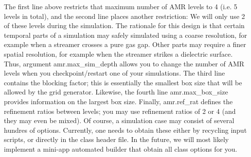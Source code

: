 The first line above restricts that maximum number of A\+MR levels to 4 (i.\+e. 5 levels in total), and the second line places another restriction\+: We will only use 2 of these levels during the simulation. The rationale for this design is that certain temporal parts of a simulation may safely simulated using a coarse resolution, for example when a streamer crosses a pure gas gap. Other parts may require a finer spatial resolution, for example when the streamer strikes a dielectric surface. Thus, argument amr.\+max\+\_\+sim\+\_\+depth allows you to change the number of A\+MR levels when you checkpoint/restart one of your simulations. The third line contains the blocking factor; this is essentially the smallest box size that will be allowed by the grid generator. Likewise, the fourth line amr.\+max\+\_\+box\+\_\+size provides information on the largest box size. Finally, amr.\+ref\+\_\+rat defines the refinement ratios between levels; you may use refinement ratios of 2 or 4 (and they may even be mixed). Of course, a simulation case may consist of several hundres of options. Currently, one needs to obtain these either by recycling input scripts, or directly in the class header file. In the future, we will most likely implement a mini-\/app automated builder that obtain all class options for you. 